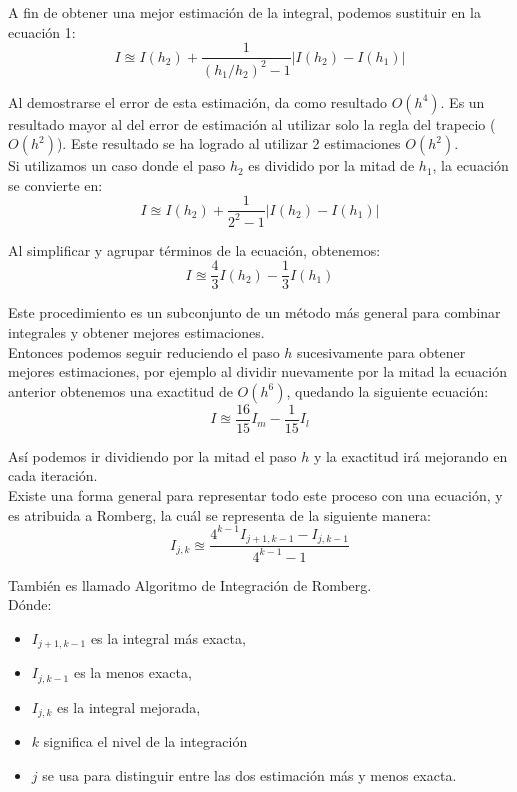 \documentclass[journal,transmag]{IEEEtran}
\theoremstyle{mytheoremstyle}
\theoremstyle{mytheoremstyle}
\theoremstyle{myproblemstyle}
\begin{document}
A fin de obtener una mejor estimación de la integral, podemos sustituir en la ecuación 1:
\begin{equation}
    I \approxeq I(h_2)+\frac{1}{(h_1/h_2)^2-1}|I(h_2)-I(h_1)|
\end{equation}

Al demostrarse el error de esta estimación, da como resultado $O(h^4)$. Es un resultado mayor al del error de estimación al utilizar solo la regla del trapecio ($O(h^2)$).
Este resultado se ha logrado al utilizar 2 estimaciones $O(h^2)$. \\

Si utilizamos un caso donde el paso $h_2$ es dividido por la mitad de $h_1$, la ecuación se convierte en:
\begin{equation}
    I \approxeq I(h_2)+\frac{1}{2^2-1}|I(h_2)-I(h_1)|
\end{equation}

Al simplificar y agrupar términos de la ecuación, obtenemos:
\begin{equation}
    I \approxeq \frac{4}{3}I(h_2)-\frac{1}{3}I(h_1)
\end{equation}

Este procedimiento es un subconjunto de un método más general para combinar integrales y obtener mejores estimaciones. \\

Entonces podemos seguir reduciendo el paso $h$ sucesivamente para obtener mejores estimaciones, por ejemplo al dividir nuevamente por la 
mitad la ecuación anterior obtenemos una exactitud de $O(h^6)$, quedando la siguiente ecuación:
\begin{equation}
    I \approxeq \frac{16}{15}I_m-\frac{1}{15}I_l
\end{equation}

Así podemos ir dividiendo por la mitad el paso $h$ y la exactitud irá mejorando en cada iteración. \\

Existe una forma general para representar todo este proceso con una ecuación, y es atribuida a Romberg, la cuál se representa de la siguiente manera:
\begin{equation}
    I_{j,k} \approxeq \frac{4^{k-1}I_{j+1, k-1}-I_{j,k-1}}{4^{k-1}-1}
\end{equation}

También es llamado Algoritmo de Integración de Romberg. \\

Dónde:
\begin{itemize}
\item $I_{j+1, k-1}$ es la integral más exacta,
\item  $I_{j, k-1}$ es la menos exacta,
\item $I_{j,k}$ es la integral mejorada,
\item $k$ significa el nivel de la integración
\item  $j$ se usa para distinguir entre las dos estimación más y menos exacta.
\end{itemize}
\end{document}
